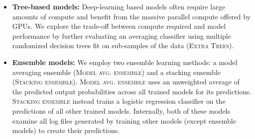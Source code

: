 \begin{itemize}[leftmargin=0cm]
    \item[]
    \textbf{Tree-based models:} Deep-learning based models often require large amounts of compute and benefit from the massive parallel compute offered by GPUs. We explore the trade-off between compute required and model performance by further evaluating an averaging classifier using multiple randomized decision trees fit on sub-samples of the data \citep{geurts2006extremely} (\textsc{Extra Trees}).
    
    \item[]
    \textbf{Ensemble models:} We employ two ensemble learning methods: a model averaging ensemble (\textsc{Model avg. ensemble}) and a stacking ensemble (\textsc{Stacking ensemble}). \textsc{Model avg. ensemble} uses an unweighted average of the predicted output probabilities across all trained models for its predictions. \textsc{Stacking ensemble} instead trains a logistic regression classifier on the predictions of all other trained models.
    Internally, both of these models examine all log files generated by training other models (except ensemble models) to create their predictions.
\end{itemize}

